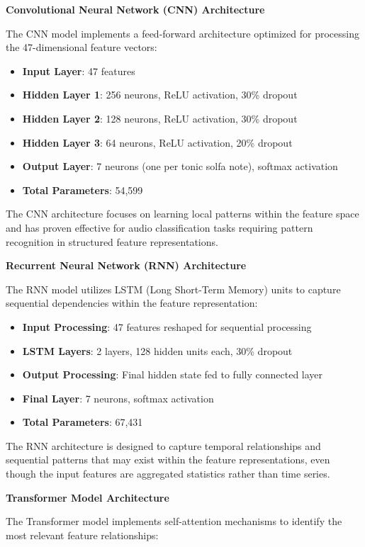 \documentclass[12pt,a4paper]{article}
\begin{document}
\textbf{Convolutional Neural Network (CNN) Architecture}

The CNN model implements a feed-forward architecture optimized for processing the 47-dimensional feature vectors:

\begin{itemize}
\item \textbf{Input Layer}: 47 features
\item \textbf{Hidden Layer 1}: 256 neurons, ReLU activation, 30\% dropout
\item \textbf{Hidden Layer 2}: 128 neurons, ReLU activation, 30\% dropout
\item \textbf{Hidden Layer 3}: 64 neurons, ReLU activation, 20\% dropout
\item \textbf{Output Layer}: 7 neurons (one per tonic solfa note), softmax activation
\item \textbf{Total Parameters}: 54,599
\end{itemize}

The CNN architecture focuses on learning local patterns within the feature space and has proven effective for audio classification tasks requiring pattern recognition in structured feature representations.

\textbf{Recurrent Neural Network (RNN) Architecture}

The RNN model utilizes LSTM (Long Short-Term Memory) units to capture sequential dependencies within the feature representation:

\begin{itemize}
\item \textbf{Input Processing}: 47 features reshaped for sequential processing
\item \textbf{LSTM Layers}: 2 layers, 128 hidden units each, 30\% dropout
\item \textbf{Output Processing}: Final hidden state fed to fully connected layer
\item \textbf{Final Layer}: 7 neurons, softmax activation
\item \textbf{Total Parameters}: 67,431
\end{itemize}

The RNN architecture is designed to capture temporal relationships and sequential patterns that may exist within the feature representations, even though the input features are aggregated statistics rather than time series.

\textbf{Transformer Model Architecture}

The Transformer model implements self-attention mechanisms to identify the most relevant feature relationships:
\end{document}
